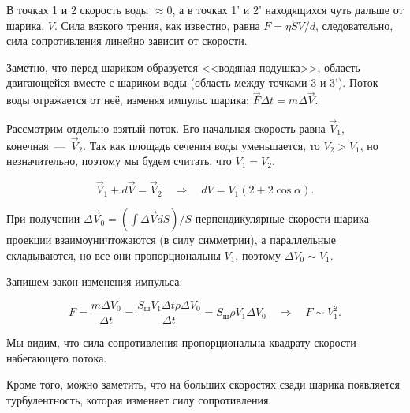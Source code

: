 В точках 1 и 2 скорость воды $\approx 0$, а в точках 1' и 2'
находящихся чуть дальше от шарика, $V$. Сила вязкого трения, как
известно, равна $F = \eta S V /d$, следовательно, сила сопротивления
линейно зависит от скорости. 

Заметно, что перед шариком образуется <<водяная подушка>>, область
двигающейся вместе с шариком воды (область между точками 3 и
3'). Поток воды отражается от неё, изменяя импульс шарика: $\vec{F}
\Delta t = m \Delta \vec{V}$. 

\begin{center}
\end{center}

Рассмотрим отдельно взятый поток. Его начальная скорость равна
$\vec{V}_1$, конечная~---~$\vec{V}_2$. Так как площадь сечения воды
уменьшается, то $V_2 > V_1$, но незначительно, поэтому мы будем
считать, что $V_1 = V_2$. 

\begin{equation}
  \label{eq:bz_3}
  \vec{V}_1 + d\vec{V} = \vec{V}_2 \quad \Rightarrow \quad dV = V_1 (2 + 2 \cos
  \alpha). 
\end{equation}

При получении $\Delta \vec{V}_0 = \left(\int \Delta \vec{V}  dS \right)
/S$ перпендикулярные скорости шарика проекции взаимоуничтожаются (в
силу симметрии), а параллельные складываются, но все они
пропорциональны $V_1$, поэтому $\Delta V_0 \sim V_1$. 

Запишем закон изменения импульса: 

\begin{equation}
  \label{eq:bz_4}
  F = \frac{m \Delta V_0}{\Delta t} = \frac{S_{\mbox{ш}} V_1 \Delta t
    \rho \Delta V_0}{\Delta t} = S_{\mbox{ш}} \rho V_1 \Delta V_0 \quad
  \Rightarrow \quad F \sim V_1^2.
\end{equation}

Мы видим, что сила сопротивления пропорциональна квадрату скорости
набегающего потока. 

Кроме того, можно заметить, что на больших скоростях сзади шарика
появляется турбулентность, которая изменяет силу сопротивления. 

